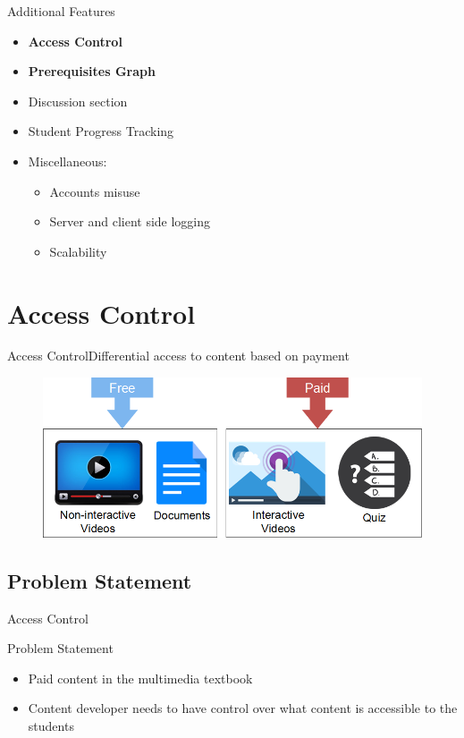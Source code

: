 \documentclass{beamer}
\begin{document}
\begin{frame}{Additional Features}
	\begin{itemize}
		\item \textbf{Access Control} %
		\item \textbf{Prerequisites Graph} %
		\item Discussion section %
		\item Student Progress Tracking
		\item Miscellaneous:
		\begin{itemize}
			\item Accounts misuse
			\item Server and client side logging
			\item Scalability
		\end{itemize}
	\end{itemize}
\end{frame}

\section{Access Control}

\begin{frame}{Access Control}{Differential access to content based on payment}
	\begin{figure}
	\centering
	\includegraphics[width=0.7\linewidth]{media/AccessControl}
	\label{fig:AccessControl}
	\end{figure}
\end{frame}

\subsection{Problem Statement}

\begin{frame}{Access Control}
	\begin{block}{Problem Statement}
		\begin{itemize}
			\item Paid content in the multimedia textbook
			\item Content developer needs to have control over what content is accessible to the students
		\end{itemize}
	\end{block}
\end{frame}
\end{document}
